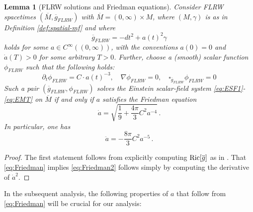 \documentclass[11pt,leqno,textwidth=10cm]{amsart}
\numberwithin{equation}{section}
\theoremstyle{definition}
\theoremstyle{plain}
\newtheorem{lemma}[definition]{Lemma}
\newcommand{\1}{\mathbbm{1}}
\newcommand{\g}{\overline{g}}
\newcommand{\M}{\overline{M}}
\newcommand{\Ric}{\text{\normalfont{Ric}}}
\newcommand{\phibar}{{\phi}_{FLRW}}
\newcommand{\del}{\partial}
\newcommand{\change}[1]{\color{black}#1\color{black}}
\begin{document}
\begin{lemma}[FLRW solutions and Friedman equations]\label{lem:FLRW}
Consider FLRW spacetimes $(\M,{\g}_{FLRW})$ with $\M=(0,\infty)\times M$, where $(M,\gamma)$ is as in Definition \ref{def:spatial-mf} and where
\begin{equation}\label{eq:FLRW-metric}
{\g}_{FLRW}=-dt^2+a(t)^2\gamma
\end{equation}
holds for some $a\in C^\infty((0,\infty))$, with the conventions $a(0)=0$ and $\dot{a}(T)>0$ for some arbitrary $T>0$. Further, choose a (smooth) scalar function $\phibar$ such that the following holds:
\begin{equation}\label{eq:FLRW-wave}
\del_t\phibar=C\cdot a(t)^{-3},\quad \nabla\phibar=0, \quad \square_{\g_{FLRW}}\phibar=0
\end{equation}
Such a pair $(\g_{FLRW},\phibar)$ solves the Einstein scalar-field system \eqref{eq:ESF1}-\eqref{eq:EMT} on $\M$ if and only if $a$ satisfies \change{the Friedman equation
\begin{equation}\label{eq:Friedman}
\dot{a}=\sqrt{\frac19+\frac{4\pi}3C^2a^{-4}}\,.
\end{equation}
In particular, one has
\begin{equation}\label{eq:Friedman2}
\ddot{a}=-\frac{8\pi}3C^2a^{-5}\,.
\end{equation}}
\end{lemma}
\begin{proof}
The first statement follows from explicitly computing $\Ric[\g]$ as in \cite[p.345]{ONeill83}. That \eqref{eq:Friedman} implies \eqref{eq:Friedman2} follows simply by computing the derivative of $\dot{a}^2$.
\end{proof}

In the subsequent analysis, the following properties of $a$ that follow from \eqref{eq:Friedman} will be crucial for our analysis:
\end{document}
